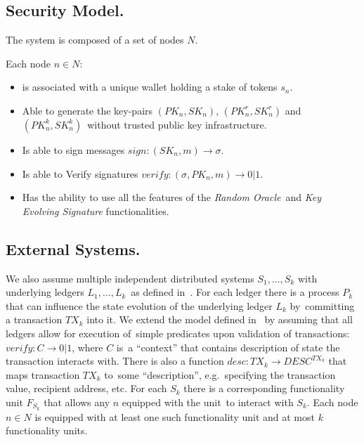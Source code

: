 \subsection{Security Model.}\label{subsec:security-model.}
The system is composed of a set of nodes $N$.

Each node $n \in N$:
\begin{itemize}
    \item is associated with a unique wallet holding a stake of tokens $s_n$.
    \item Able to generate the key-pairs ${(PK_n, SK_n)}$, ${(PK^r_n, SK^r_n)}$ and ${(PK^k_n, SK^k_n)}$\
    without trusted public key infrastructure.
    \item Is able to sign messages ${sign: (SK_n, m) \rightarrow \sigma}$.
    \item Is able to Verify signatures ${verify: (\sigma, PK_n, m) \rightarrow 0 | 1}$.
    \item Has the ability to use all the features of the \textit{Random Oracle}\
    and \textit{Key Evolving Signature} functionalities.
\end{itemize}

\subsection{External Systems.}\label{subsec:external-systems.}
We also assume multiple independent distributed systems ${S_1, \dots, S_k}$ with underlying ledgers ${L_1, \dots, L_k}$\
as defined in~\cite{cryptoeprint:2019/1128}.
For each ledger there is a process $P_k$ that can influence the state evolution of the underlying ledger $L_k$ by\
committing a transaction $TX_k$ into it.
We extend the model defined in~\cite{cryptoeprint:2019/1128} by assuming that all ledgers allow for execution of\
simple predicates upon validation of transactions: ${verify: C \rightarrow 0 | 1}$, where $C$ is\
a \enquote{context} that contains description of state the transaction interacts with.
There is also a function ${desc: TX_k \rightarrow DESC^{TX_k}}$ that maps transaction $TX_k$ to\
some \enquote{description}, e.g.\ specifying the transaction value, recipient address, etc.
For each  $S_k$ there is a corresponding functionality unit $F_{S_k}$ that allows any $n$ equipped with the unit\
to interact with $S_k$.
Each node $n \in N$ is equipped with at least one such functionality unit and at most $k$ functionality units.